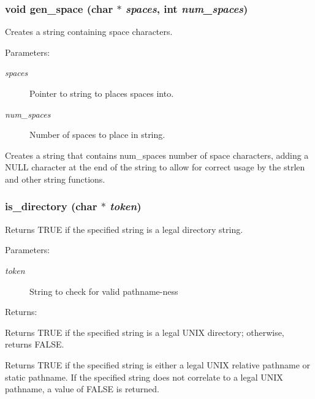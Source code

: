 \subsubsection{\setlength{\rightskip}{0pt plus 5cm}void gen\_\-space (char $\ast$ {\em spaces}, int {\em num\_\-spaces})}\label{util_8h_a14}


Creates a string containing space characters.

\begin{Desc}
\item[Parameters: ]\par
\begin{description}
\item[{\em 
spaces}]Pointer to string to places spaces into. \item[{\em 
num\_\-spaces}]Number of spaces to place in string.\end{description}
\end{Desc}
Creates a string that contains num\_\-spaces number of space characters, adding a NULL character at the end of the string to allow for correct usage by the strlen and other string functions. 
\subsubsection{ is\_\-directory (char $\ast$ {\em token})}\label{util_8h_a4}


Returns TRUE if the specified string is a legal directory string.

\begin{Desc}
\item[Parameters: ]\par
\begin{description}
\item[{\em 
token}]String to check for valid pathname-ness \end{description}
\end{Desc}
\begin{Desc}
\item[Returns: ]\par
Returns TRUE if the specified string is a legal UNIX directory; otherwise, returns FALSE.\end{Desc}
Returns TRUE if the specified string is either a legal UNIX relative pathname or static pathname. If the specified string does not correlate to a legal UNIX pathname, a value of FALSE is returned. 
